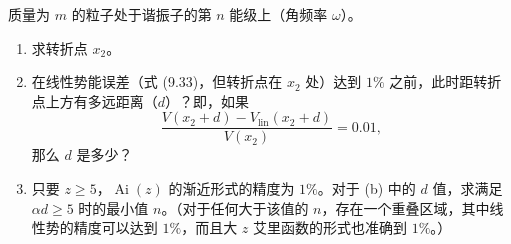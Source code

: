\begin{question}
质量为 $m$ 的粒子处于谐振子的第 $n$ 能级上（角频率 $\omega$）。
\begin{enumerate}
\item 求转折点 $x_2$。
\item 在线性势能误差（式 (9.33)，但转折点在 $x_2$ 处）达到 $1\%$ 之前，此时距转折点上方有多远距离（$d$）？即，如果
\[
\frac{V(x_2+d)-V_{\mathrm{lin}}(x_2+d)}{V(x_2)}=0.01,
\]
那么 $d$ 是多少？
\item 只要 $z\ge5$，$\operatorname{Ai}(z)$ 的渐近形式的精度为 $1\%$。对于 (b) 中的 $d$ 值，求满足 $\alpha d\ge5$ 时的最小值 $n$。（对于任何大于该值的 $n$，存在一个重叠区域，其中线性势的精度可以达到 $1\%$，而且大 $z$ 艾里函数的形式也准确到 $1\%$。）
\end{enumerate}

\par\smallskip
{}

\end{question}
